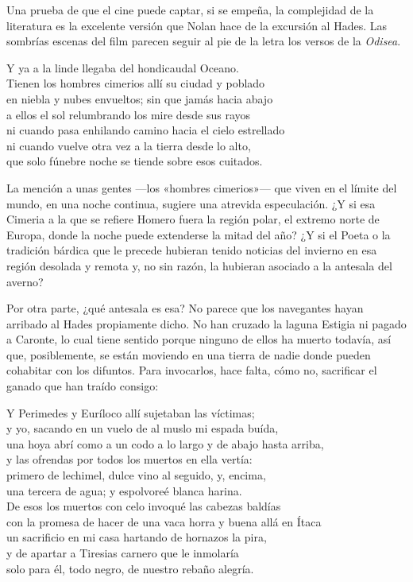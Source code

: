 \label{cap:hades}

Una prueba de que el cine puede captar, si se empeña, la complejidad de la literatura es la excelente versión que Nolan hace de la excursión al Hades. Las sombrías escenas del film parecen seguir al pie de la letra los versos de la \emph{Odisea}.

\begin{versocita}
Y ya a la linde llegaba del hondicaudal Oceano.\\
Tienen los hombres cimerios allí su ciudad y poblado\\
en niebla y nubes envueltos; sin que jamás hacia abajo\\
a ellos el sol relumbrando los mire desde sus rayos\\
ni cuando pasa enhilando camino hacia el cielo estrellado\\
ni cuando vuelve otra vez a la tierra desde lo alto,\\
que solo fúnebre noche se tiende sobre esos cuitados.
\end{versocita}

La mención a unas gentes ---los «hombres cimerios»--- que viven en el límite del mundo, en una noche continua, sugiere una atrevida especulación. ¿Y si esa Cimeria a la que se refiere Homero fuera la región polar, el extremo norte de Europa, donde la noche puede extenderse la mitad del año? ¿Y si el Poeta o la tradición bárdica que le precede hubieran tenido noticias del invierno en esa región desolada y remota y, no sin razón, la hubieran asociado a la antesala del averno?

Por otra parte, ¿qué antesala es esa? No parece que los navegantes hayan arribado al Hades propiamente dicho. No han cruzado la laguna Estigia ni pagado a Caronte, lo cual tiene sentido porque ninguno de ellos ha muerto todavía, así que, posiblemente, se están moviendo en una tierra de nadie donde pueden cohabitar con los difuntos. Para invocarlos, hace falta, cómo no, sacrificar el ganado que han traído consigo:

\begin{versocita}
Y Perimedes y Euríloco allí sujetaban las víctimas;\\
y yo, sacando en un vuelo de al muslo mi espada buída,\\
una hoya abrí como a un codo a lo largo y de abajo hasta arriba,\\
y las ofrendas por todos los muertos en ella vertía:\\
primero de lechimel, dulce vino al seguido, y, encima,\\
una tercera de agua; y espolvoreé blanca harina.\\
De esos los muertos con celo invoqué las cabezas baldías\\
con la promesa de hacer de una vaca horra y buena allá en Ítaca\\
un sacrificio en mi casa hartando de hornazos la pira,\\
y de apartar a Tiresias carnero que le inmolaría\\
solo para él, todo negro, de nuestro rebaño alegría.
\end{versocita}

